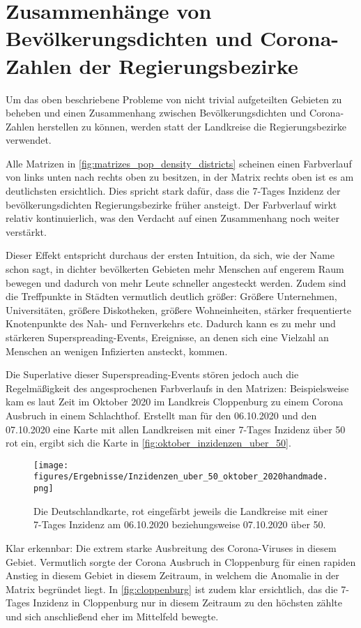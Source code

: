 \section{Zusammenhänge von Bevölkerungsdichten und Corona-Zahlen der Regierungsbezirke}
Um das oben beschriebene Probleme von nicht trivial aufgeteilten Gebieten zu beheben und einen Zusammenhang zwischen Bevölkerungsdichten und Corona-Zahlen herstellen zu können, werden statt der Landkreise die Regierungsbezirke verwendet.

Alle Matrizen in \autoref{fig:matrizes_pop_density_districts} scheinen einen Farbverlauf von links unten nach rechts oben zu besitzen, in der Matrix rechts oben ist es am deutlichsten ersichtlich. Dies spricht stark dafür, dass die 7-Tages Inzidenz der bevölkerungsdichten Regierungsbezirke früher ansteigt. Der Farbverlauf wirkt relativ kontinuierlich, was den Verdacht auf einen Zusammenhang noch weiter verstärkt.

Dieser Effekt entspricht durchaus der ersten Intuition, da sich, wie der Name schon sagt, in dichter bevölkerten Gebieten mehr Menschen auf engerem Raum bewegen und dadurch von mehr Leute schneller angesteckt werden.
Zudem sind die Treffpunkte in Städten vermutlich deutlich größer: Größere Unternehmen, Universitäten, größere Diskotheken, größere Wohneinheiten, stärker frequentierte Knotenpunkte des Nah- und Fernverkehrs etc. Dadurch kann es zu mehr und stärkeren Superspreading-Events, Ereignisse, an denen sich eine Vielzahl an Menschen an wenigen Infizierten ansteckt, kommen.

Die Superlative dieser Superspreading-Events stören jedoch auch die Regelmäßigkeit des angesprochenen Farbverlaufs in den Matrizen: Beispielsweise kam es laut Zeit \autocite{} im Oktober 2020 im Landkreis Cloppenburg zu einem Corona Ausbruch in einem Schlachthof. Erstellt man für den 06.10.2020 und den 07.10.2020 eine Karte mit allen Landkreisen mit einer 7-Tages Inzidenz über 50 rot ein, ergibt sich die Karte in \autoref{fig:oktober_inzidenzen_uber_50}. 

\begin{figure}
    \centering
    \texttt{[image: figures/Ergebnisse/Inzidenzen\_uber\_50\_oktober\_2020handmade.png]}
    \caption{Die Deutschlandkarte, rot eingefärbt jeweils die Landkreise mit einer 7-Tages Inzidenz am 06.10.2020 beziehungsweise 07.10.2020 über 50.}
    \label{fig:oktober_inzidenzen_uber_50}
\end{figure}
Klar erkennbar: Die extrem starke Ausbreitung des Corona-Viruses in diesem Gebiet. Vermutlich sorgte der Corona Ausbruch in Cloppenburg für einen rapiden Anstieg in diesem Gebiet in diesem Zeitraum, in welchem die Anomalie in der Matrix begründet liegt. In \autoref{fig:cloppenburg} ist zudem klar ersichtlich, das die 7-Tages Inzidenz in Cloppenburg nur in diesem Zeitraum zu den höchsten zählte und sich anschließend eher im Mittelfeld bewegte.

